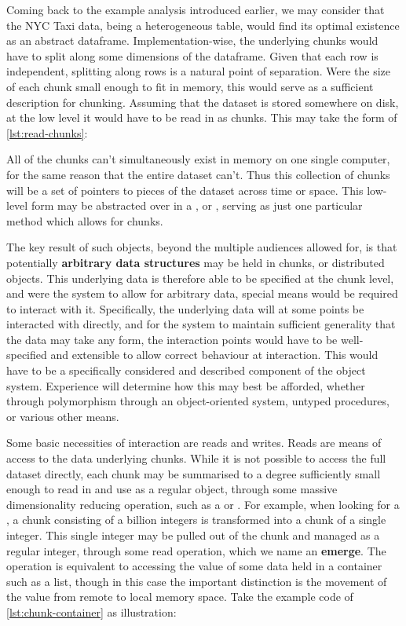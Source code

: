 Coming back to the example analysis introduced earlier, we may consider
that the NYC Taxi data, being a heterogeneous table, would find its
optimal existence as an abstract dataframe. Implementation-wise, the
underlying chunks would have to split along some dimensions of the
dataframe. Given that each row is independent, splitting along rows is a
natural point of separation. Were the size of each chunk small enough to
fit in memory, this would serve as a sufficient description for
chunking. Assuming that the dataset is stored somewhere on disk, at the
low level it would have to be read in as chunks. This may take the form of
\cref{lst:read-chunks}:


All of the chunks can't simultaneously exist in memory on one single
computer, for the same reason that the entire dataset can't. Thus this
collection of chunks will be a set of pointers to pieces of the dataset
across time or space. This low-level form may be abstracted over in a
, or , serving as just one particular
method which allows for chunks.

The key result of such objects, beyond the multiple audiences allowed
for, is that potentially \textbf{arbitrary data structures} may be held
in chunks, or distributed objects. This underlying data is therefore
able to be specified at the chunk level, and were the system to allow
for arbitrary data, special means would be required to interact with it.
Specifically, the underlying data will at some points be interacted with
directly, and for the system to maintain sufficient generality that the
data may take any form, the interaction points would have to be
well-specified and extensible to allow correct behaviour at interaction.
This would have to be a specifically considered and described component
of the object system. Experience will determine how this may best be
afforded, whether through polymorphism through an object-oriented
system, untyped procedures, or various other means.

Some basic necessities of interaction are reads and writes. Reads are
means of access to the data underlying chunks. While it is not possible
to access the full dataset directly, each chunk may be summarised to a
degree sufficiently small enough to read in and use as a regular object,
through some massive dimensionality reducing operation, such as a
 or . For example, when looking for a
, a chunk consisting of a billion integers is transformed
into a chunk of a single integer. This single integer may be pulled out
of the chunk and managed as a regular integer, through some read
operation, which we name an \textbf{emerge}. The operation is equivalent
to accessing the value of some data held in a container such as a list,
though in this case the important distinction is the movement of the
value from remote to local memory space. Take the example code of \cref{lst:chunk-container}
as illustration:

